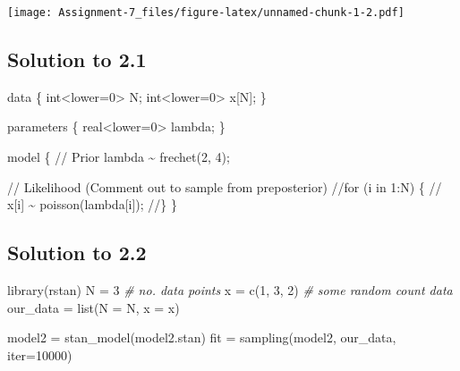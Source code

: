 \documentclass[
]{article}
\newenvironment{Shaded}{\begin{snugshade}}{\end{snugshade}}
\newcommand{\AttributeTok}[1]{\textcolor[rgb]{0.77,0.63,0.00}{#1}}
\newcommand{\CommentTok}[1]{\textcolor[rgb]{0.56,0.35,0.01}{\textit{#1}}}
\newcommand{\DecValTok}[1]{\textcolor[rgb]{0.00,0.00,0.81}{#1}}
\newcommand{\FunctionTok}[1]{\textcolor[rgb]{0.00,0.00,0.00}{#1}}
\newcommand{\NormalTok}[1]{#1}
\newcommand{\OtherTok}[1]{\textcolor[rgb]{0.56,0.35,0.01}{#1}}
\newcommand{\StringTok}[1]{\textcolor[rgb]{0.31,0.60,0.02}{#1}}
\begin{document}
\texttt{[image: Assignment-7\_files/figure-latex/unnamed-chunk-1-2.pdf]}

\hypertarget{solution-to-2.1}{%
\subsection{Solution to 2.1}\label{solution-to-2.1}}

\begin{Shaded}
\begin{Highlighting}[]
\NormalTok{data \{}
\NormalTok{  int\textless{}lower=0\textgreater{} N;}
\NormalTok{  int\textless{}lower=0\textgreater{} x[N];}
\NormalTok{\}}

\NormalTok{parameters \{}
\NormalTok{  real\textless{}lower=0\textgreater{} lambda;}
\NormalTok{\}}

\NormalTok{model \{}
\NormalTok{  // Prior}
\NormalTok{  lambda \textasciitilde{} frechet(2, 4);}
  
\NormalTok{  // Likelihood (Comment out to sample from preposterior)}
\NormalTok{  //for (i in 1:N) \{}
\NormalTok{  //  x[i] \textasciitilde{} poisson(lambda[i]);}
\NormalTok{  //\}}
\NormalTok{\}}
\end{Highlighting}
\end{Shaded}

\hypertarget{solution-to-2.2}{%
\subsection{Solution to 2.2}\label{solution-to-2.2}}

\begin{Shaded}
\begin{Highlighting}[]
\FunctionTok{library}\NormalTok{(rstan)}
\NormalTok{N }\OtherTok{=} \DecValTok{3} \CommentTok{\# no. data points}
\NormalTok{x }\OtherTok{=} \FunctionTok{c}\NormalTok{(}\DecValTok{1}\NormalTok{, }\DecValTok{3}\NormalTok{, }\DecValTok{2}\NormalTok{) }\CommentTok{\# some random count data}
\NormalTok{our\_data }\OtherTok{=} \FunctionTok{list}\NormalTok{(}\AttributeTok{N =}\NormalTok{ N, }\AttributeTok{x =}\NormalTok{ x)}

\NormalTok{model2 }\OtherTok{=} \FunctionTok{stan\_model}\NormalTok{(}\StringTok{\textquotesingle{}model2.stan\textquotesingle{}}\NormalTok{)}
\NormalTok{fit }\OtherTok{=} \FunctionTok{sampling}\NormalTok{(model2, our\_data, }\AttributeTok{iter=}\DecValTok{10000}\NormalTok{)}
\end{Highlighting}
\end{Shaded}
\end{document}
